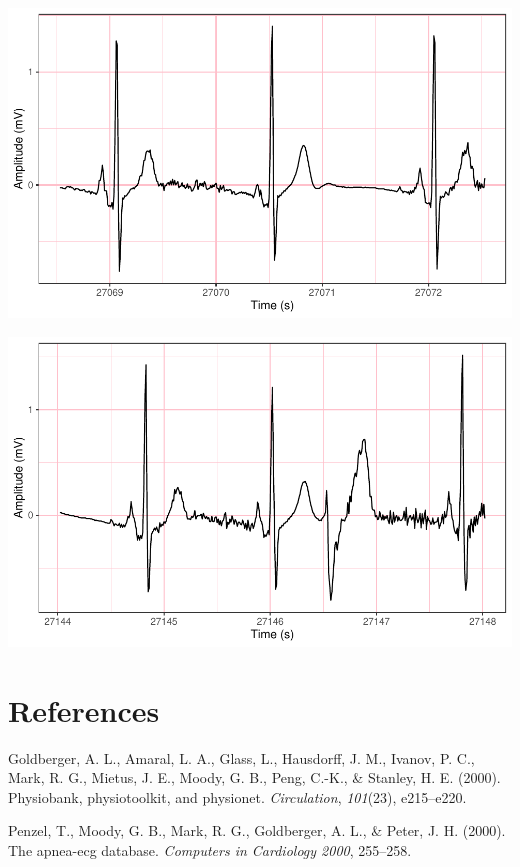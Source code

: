 \documentclass[
]{article}
\newlength{\cslhangindent}
\newlength{\cslentryspacingunit} %
\newenvironment{CSLReferences}[2] %
 {%
  \setlength{\parindent}{0pt}
  \ifodd #1
  \let\oldpar\par
  \def\par{\hangindent=\cslhangindent\oldpar}
  \fi
  \setlength{\parskip}{#2\cslentryspacingunit}
 }%
 {}
\begin{document}
\begin{center}\includegraphics{report_files/figure-latex/abnormal-interval-57} \end{center}

\begin{center}\includegraphics{report_files/figure-latex/abnormal-interval-58} \end{center}

\newpage

\hypertarget{references}{%
\section*{References}\label{references}}

\hypertarget{refs}{}
\begin{CSLReferences}{1}{1}
\leavevmode{}%
Goldberger, A. L., Amaral, L. A., Glass, L., Hausdorff, J. M., Ivanov,
P. C., Mark, R. G., Mietus, J. E., Moody, G. B., Peng, C.-K., \&
Stanley, H. E. (2000). Physiobank, physiotoolkit, and physionet.
\emph{Circulation}, \emph{101}(23), e215--e220.

\leavevmode{}%
Penzel, T., Moody, G. B., Mark, R. G., Goldberger, A. L., \& Peter, J.
H. (2000). The apnea-ecg database. \emph{Computers in Cardiology 2000},
255--258.

\end{CSLReferences}
\end{document}
